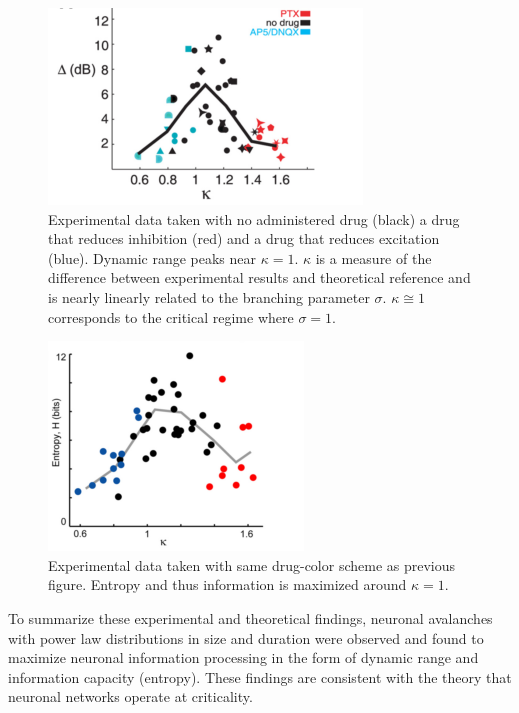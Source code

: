 \documentclass[12pt]{article}
\begin{document}
\begin{figure}      
  \begin{center}    
 \includegraphics[width=.5\textwidth]{dynamicrangeexpplenz}    
    \caption{Experimental data taken with no administered drug (black) a drug that reduces inhibition (red) and a drug that reduces excitation (blue). Dynamic range peaks near $\kappa = 1$. $\kappa$ is a measure of the difference between experimental results and theoretical reference and is nearly linearly related to the branching parameter $\sigma$. $\kappa \cong 1$ corresponds to the critical regime where $\sigma = 1$. \cite{Shew2009b}}   
   \label{Figure::Dynamic Range Experiment}   
  \end{center}     
   \end{figure}
   
\begin{figure}      
  \begin{center}    
 \includegraphics[width=.40\textwidth]{entropyplenz}    
    \caption{Experimental data taken with same drug-color scheme as previous figure. Entropy and thus information is maximized around $\kappa = 1$. \cite{Shew2011a}}   
   \label{Figure::Entropy / information maximized experimental}   
  \end{center}     
   \end{figure}
   

To summarize these experimental and theoretical findings, neuronal avalanches with power law distributions in size and duration were observed and found to maximize neuronal information processing in the form of dynamic range and information capacity (entropy). These findings are consistent with the theory that neuronal networks operate at criticality. 
\end{document}
